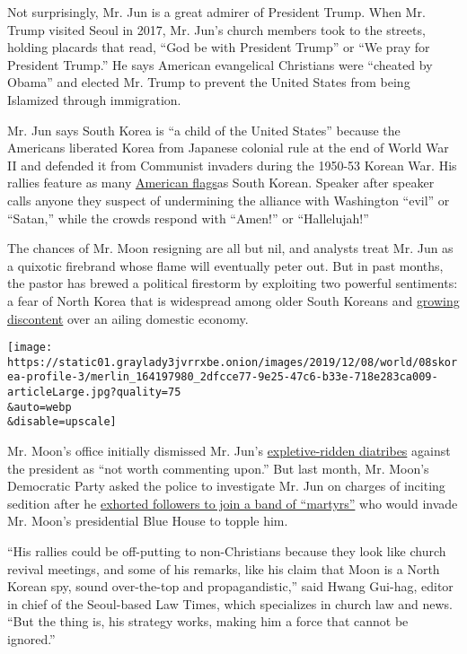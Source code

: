 Not surprisingly, Mr. Jun is a great admirer of President Trump. When
Mr. Trump visited Seoul in 2017, Mr. Jun's church members took to the
streets, holding placards that read, ``God be with President Trump'' or
``We pray for President Trump.'' He says American evangelical Christians
were ``cheated by Obama'' and elected Mr. Trump to prevent the United
States from being Islamized through immigration.

Mr. Jun says South Korea is ``a child of the United States'' because the
Americans liberated Korea from Japanese colonial rule at the end of
World War II and defended it from Communist invaders during the 1950-53
Korean War. His rallies feature as many
\href{https://www.youtube.com/watch?v=rJ1zzu9xLMk}{American flags}as
South Korean. Speaker after speaker calls anyone they suspect of
undermining the alliance with Washington ``evil'' or ``Satan,'' while
the crowds​ respond with ``Amen!'' or ``Hallelujah!''

​The chances of Mr. Moon resigning are all but nil, and analysts treat
Mr. Jun as a quixotic firebrand whose flame will eventually peter out.
But in past months, the pastor has brewed a political firestorm by
exploiting two powerful sentiments: a fear of North Korea that is
widespread among older South Koreans and
\href{https://www.nytimes3xbfgragh.onion/2019/10/21/world/asia/south-korea-cho-kuk-gold-spoon-elite.html?searchResultPosition=2}{growing
discontent} over an ailing domestic economy.

\texttt{[image: https://static01.graylady3jvrrxbe.onion/images/2019/12/08/world/08skorea-profile-3/merlin\_164197980\_2dfcce77-9e25-47c6-b33e-718e283ca009-articleLarge.jpg?quality=75\\\&auto=webp\\\&disable=upscale]}

Mr. Moon's office initially dismissed Mr. Jun's
\href{https://www.youtube.com/watch?v=pjyYe_vhLmY}{expletive-ridden
diatribes} against the president as ``not worth commenting upon.'' But
last month, Mr. Moon's Democratic Party asked the police to investigate
Mr. Jun on charges of inciting sedition after he
\href{https://www.youtube.com/watch?v=ntrDZvMqomw}{exhorted followers to
join a band of ``martyrs''} who would invade Mr. Moon's presidential
Blue House to topple him.

``His rallies could be off-putting to non-Christians because they look
like church revival meetings, and some of his remarks, like his claim
that Moon is a North Korean spy, sound over-the-top and
propagandistic,'' said Hwang Gui-hag, editor in chief of the Seoul-based
Law Times, which specializes in church law and news. ``But the thing is,
his strategy works, making him a force that cannot be ignored.''

